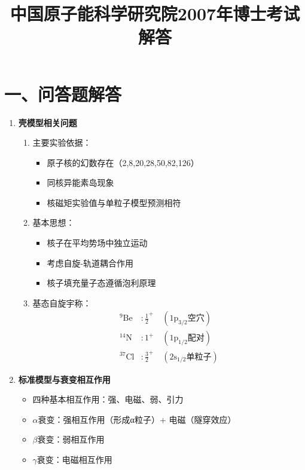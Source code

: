 \documentclass{article}
\title{中国原子能科学研究院2007年博士考试解答}
\date{}
\begin{document}
\maketitle

\section*{一、问答题解答}
\begin{enumerate}
  \item \textbf{壳模型相关问题}
  \begin{enumerate}
    \item 主要实验依据：
    \begin{itemize}
      \item 原子核的幻数存在（2,8,20,28,50,82,126）
      \item 同核异能素岛现象
      \item 核磁矩实验值与单粒子模型预测相符
    \end{itemize}
    
    \item 基本思想：
    \begin{itemize}
      \item 核子在平均势场中独立运动
      \item 考虑自旋-轨道耦合作用
      \item 核子填充量子态遵循泡利原理
    \end{itemize}
    
    \item 基态自旋宇称：
    \begin{align*}
      ^{9}\text{Be} & : \frac{1}{2}^+ \quad (\text{1p}_{3/2} \text{空穴}) \\
      ^{14}\text{N} & : 1^+ \quad (\text{1p}_{1/2} \text{配对}) \\
      ^{37}\text{Cl} & : \frac{3}{2}^+ \quad (\text{2s}_{1/2} \text{单粒子})
    \end{align*}
  \end{enumerate}

  \item \textbf{标准模型与衰变相互作用}
  \begin{itemize}
    \item 四种基本相互作用：强、电磁、弱、引力
    \item $\alpha$衰变：强相互作用（形成α粒子）+ 电磁（隧穿效应）
    \item $\beta$衰变：弱相互作用
    \item $\gamma$衰变：电磁相互作用
  \end{itemize}


\end{enumerate}
\end{document}
